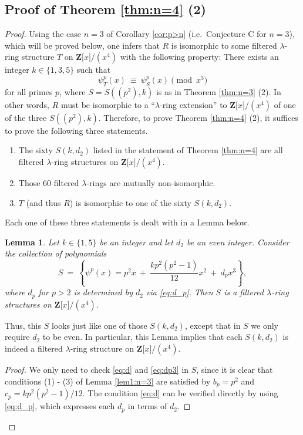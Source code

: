 \documentclass[reqno,11pt]{amsart}
\numberwithin{equation}{subsection}  %
\newtheorem{lemma}[subsection]{Lemma}
\newcommand{\bZ}{\mathbf{Z}}
\begin{document}
\subsection{Proof of Theorem \ref{thm:n=4} (2)}
\begin{proof}
Using the case $n = 3$ of Corollary \ref{cor:p>n} (i.e.\ Conjecture C for $n = 3$), which will be proved below, one infers that $R$ is isomorphic to some filtered $\lambda$-ring structure $T$ on $\bZ \lbrack x \rbrack/(x^4)$ with the following property: There exists an integer $k \in \lbrace 1, 3, 5 \rbrace$ such that
   \[
   \psi^p_T(x) ~\equiv~ \psi^p_S(x) \pmod{x^3}
   \]
for all primes $p$, where $S = S((p^2), k)$ is as in Theorem \ref{thm:n=3} (2).  In other words, $R$ must be isomorphic to a ``$\lambda$-ring extension'' to $\bZ \lbrack x \rbrack/(x^4)$ of one of the three $S((p^2), k)$.  Therefore, to prove Theorem \ref{thm:n=4} (2), it suffices to prove the following three statements.
   \begin{enumerate}
   \item The sixty $S(k, d_2)$ listed in the statement of Theorem \ref{thm:n=4} are all filtered $\lambda$-ring structures on $\bZ \lbrack x \rbrack/(x^4)$.
   \item Those $60$ filtered $\lambda$-rings are mutually non-isomorphic.
   \item $T$ (and thus $R$) is isomorphic to one of the sixty $S(k, d_2)$.
   \end{enumerate}
Each one of these three statements is dealt with in a Lemma below.


\medskip
\begin{lemma}
\label{lem1:n=4}
Let $k \in \lbrace 1, 5 \rbrace$ be an integer and let $d_2$ be an even integer.  Consider the collection of polynomials
   \[
   S ~=~ \left\lbrace \psi^p(x) = p^2x ~+~ \frac{kp^2(p^2 - 1)}{12}x^2 ~+~ d_px^3 \right\rbrace,
   \]
where $d_p$ for $p > 2$ is determined by $d_2$ via \eqref{eq:d_p}.  Then $S$ is a filtered $\lambda$-ring structures on $\bZ \lbrack x \rbrack/(x^4)$.
\end{lemma}


Thus, this $S$ looks just like one of those $S(k, d_2)$, except that in $S$ we only require $d_2$ to be even.  In particular, this Lemma implies that each $S(k, d_2)$ is indeed a filtered $\lambda$-ring structure on  $\bZ \lbrack x \rbrack/(x^4)$.


\begin{proof}
We only need to check \eqref{eq:d} and \eqref{eq:dp3} in $S$, since it is clear that conditions (1) - (3) of Lemma \ref{lem1:n=3} are satisfied by $b_p = p^2$ and $c_p = kp^2(p^2 - 1)/12$.  The condition \eqref{eq:d} can be verified directly by using \eqref{eq:d_p}, which expresses each $d_p$ in terms of $d_2$.



\end{proof}
\end{proof}
\end{document}
